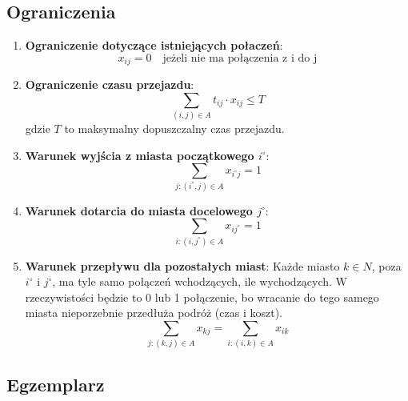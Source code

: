 \documentclass[12pt, letterpaper]{article}
\begin{document}
\subsection{Ograniczenia}
\begin{enumerate}
  \item \textbf{Ograniczenie dotyczące istniejących połaczeń}:
        \[
          x_{ij} = 0 \quad \text{jeżeli nie ma połączenia z i do j}
        \]
  \item \textbf{Ograniczenie czasu przejazdu}:
        \[
          \sum_{(i, j) \in A} t_{ij} \cdot x_{ij} \leq T
        \]
        gdzie \( T \) to maksymalny dopuszczalny czas przejazdu.

  \item \textbf{Warunek wyjścia z miasta początkowego \( i^\circ \)}:
        \[
          \sum_{j : (i^\circ, j) \in A} x_{i^\circ j} = 1
        \]

  \item \textbf{Warunek dotarcia do miasta docelowego \( j^\circ \)}:
        \[
          \sum_{i : (i, j^\circ) \in A} x_{ij^\circ} = 1
        \]

  \item \textbf{Warunek przepływu dla pozostałych miast}:
        Każde miasto \( k \in N \), poza \( i^\circ \) i \( j^\circ \), ma tyle
        samo połączeń wchodzących, ile wychodzących. W rzeczywistości będzie to
        0 lub 1 połączenie,
        bo wracanie do tego samego miasta nieporzebnie przedłuża podróż (czas i
        koszt).
        \[
          \sum_{j : (k, j) \in A} x_{kj} = \sum_{i : (i, k) \in A} x_{ik}
        \]
\end{enumerate}

\subsection{Egzemplarz}
\end{document}
